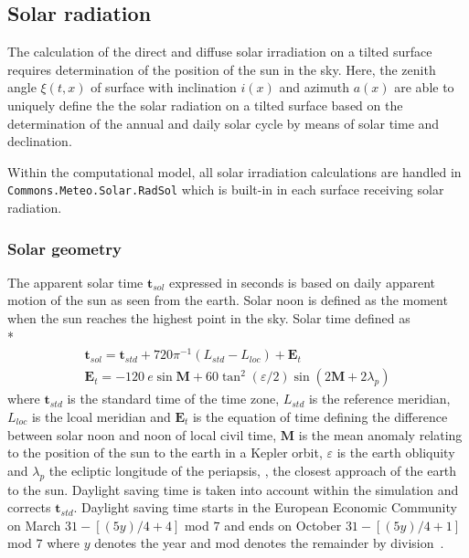 \subsection{Solar radiation}
\label{chap:climsol}

The calculation of the direct and diffuse solar irradiation on a tilted surface requires determination of the position of the sun in the sky. Here, the zenith angle $\xi(t,x)$ of surface with inclination $i(x)$ and azimuth $a(x)$ are able to uniquely define the the solar radiation on a tilted surface based on the determination of the annual and daily solar cycle by means of solar time and declination.

Within the computational model, all solar irradiation calculations are handled in \texttt{Commons.Meteo.Solar.RadSol} which is built-in in each surface receiving solar radiation.

\subsubsection{Solar geometry}

The apparent solar time $\boldsymbol{t}_{sol}$ expressed in seconds is based on daily apparent motion of the sun as seen from the earth. Solar noon is defined as the moment when the sun reaches the highest point in the sky. Solar time defined as \\*
\begin{gather}
\boldsymbol{t}_{sol} = \boldsymbol{t}_{std} + 720\pi^{-1}\left(L_{std}-L_{loc}\right) + \boldsymbol{E}_{t} \\
\boldsymbol{E}_{t} = -120\ e\sin \boldsymbol{M} + 60\tan^{2} \left(\varepsilon/2\right) \sin \left(2\boldsymbol{M}+2\lambda_{p}\right)
\end{gather}
where $\boldsymbol{t}_{std}$ is the standard time of the time zone, $L_{std}$ is the reference meridian, $L_{loc}$ is the lcoal meridian and $\boldsymbol{E}_{t}$ is the equation of time defining the difference between solar noon and noon of local civil time, $\boldsymbol{M}$ is the mean anomaly relating to the position of the sun to the earth in a Kepler orbit, $\varepsilon$ is the earth obliquity and $\lambda_{p}$ the ecliptic longitude of the periapsis, \ie, the closest approach of the earth to the sun. Daylight saving time is taken into account within the simulation and corrects $\boldsymbol{t}_{std}$. Daylight saving time starts in the European Economic Community on March $31-\left[(5y)/4+4\right]$ mod $7$ and ends on October $31-\left[(5y)/4+1\right]$ mod $7$ where $y$ denotes the year and mod denotes the remainder by division~\cite{VanGent2011}.

